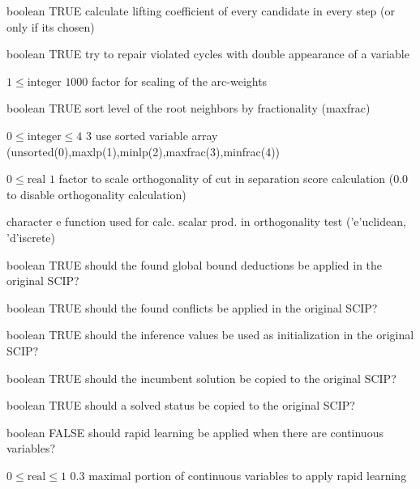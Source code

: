 %
{boolean}%
{TRUE}%
{calculate lifting coefficient of every candidate in every step (or only if its chosen)}%
{}

%
{boolean}%
{TRUE}%
{try to repair violated cycles with double appearance of a variable}%
{}

%
{$1\leq\textrm{integer}$}%
{$1000$}%
{factor for scaling of the arc-weights}%
{}

%
{boolean}%
{TRUE}%
{sort level of the root neighbors by fractionality (maxfrac)}%
{}

%
{$0\leq\textrm{integer}\leq4$}%
{$3$}%
{use sorted variable array (unsorted(0),maxlp(1),minlp(2),maxfrac(3),minfrac(4))}%
{}

%
{$0\leq\textrm{real}$}%
{$1$}%
{factor to scale orthogonality of cut in separation score calculation (0.0 to disable orthogonality calculation)}%
{}

%
{character}%
{e}%
{function used for calc. scalar prod. in orthogonality test ('e'uclidean, 'd'iscrete)}%
{}

%
{boolean}%
{TRUE}%
{should the found global bound deductions be applied in the original SCIP?}%
{}

%
{boolean}%
{TRUE}%
{should the found conflicts be applied in the original SCIP?}%
{}

%
{boolean}%
{TRUE}%
{should the inference values be used as initialization in the original SCIP?}%
{}

%
{boolean}%
{TRUE}%
{should the incumbent solution be copied to the original SCIP?}%
{}

%
{boolean}%
{TRUE}%
{should a solved status be copied to the original SCIP?}%
{}

%
{boolean}%
{FALSE}%
{should rapid learning be applied when there are continuous variables?}%
{}

%
{$0\leq\textrm{real}\leq1$}%
{$0.3$}%
{maximal portion of continuous variables to apply rapid learning}%
{}

